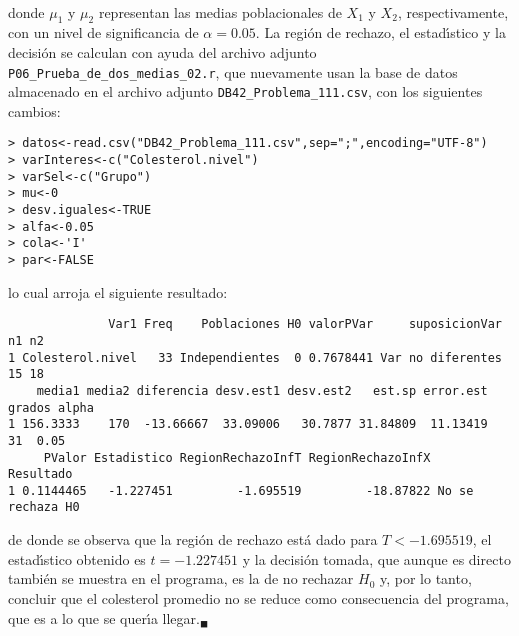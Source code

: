 \begin{solucion}
\begin{eqnarray*}
 \end{eqnarray*}
 donde $\mu_1$ y $\mu_2$ representan las medias poblacionales
 de $X_1$ y $X_2$, respectivamente,
 con un nivel de significancia de $\alpha = 0.05$.
 La regi\'on de rechazo, el estad\'{\i}stico y la decisi\'on
 se calculan con ayuda del archivo adjunto
 \texttt{P06\_Prueba\_de\_dos\_medias\_02.r},
 que nuevamente usan la base de datos almacenado en el archivo adjunto
 \texttt{DB42\_Problema\_111.csv}, con los siguientes cambios:
 \begin{verbatim}
> datos<-read.csv("DB42_Problema_111.csv",sep=";",encoding="UTF-8")
> varInteres<-c("Colesterol.nivel")
> varSel<-c("Grupo")
> mu<-0
> desv.iguales<-TRUE
> alfa<-0.05
> cola<-'I'
> par<-FALSE
 \end{verbatim}
 \vspace{-0.5cm}
 lo cual arroja el siguiente resultado:
 \begin{verbatim}
              Var1 Freq    Poblaciones H0 valorPVar     suposicionVar n1 n2
1 Colesterol.nivel   33 Independientes  0 0.7678441 Var no diferentes 15 18
    media1 media2 diferencia desv.est1 desv.est2   est.sp error.est grados alpha
1 156.3333    170  -13.66667  33.09006   30.7877 31.84809  11.13419     31  0.05
     PValor Estadistico RegionRechazoInfT RegionRechazoInfX        Resultado
1 0.1144465   -1.227451         -1.695519         -18.87822 No se rechaza H0
 \end{verbatim}
 \vspace{-0.5cm}
 de donde se observa que la regi\'on de rechazo est\'a dado
 para $T < -1.695519$,
 el estad\'{\i}stico obtenido es $t = -1.227451$ y la decisi\'on tomada,
 que aunque es directo tambi\'en se muestra en el programa,
 es la de no rechazar $H_0$ y, por lo tanto, concluir
 que el colesterol promedio no se reduce como consecuencia del programa,
 que es a lo que se quer\'{\i}a llegar.${}_{\blacksquare}$
\end{solucion}
